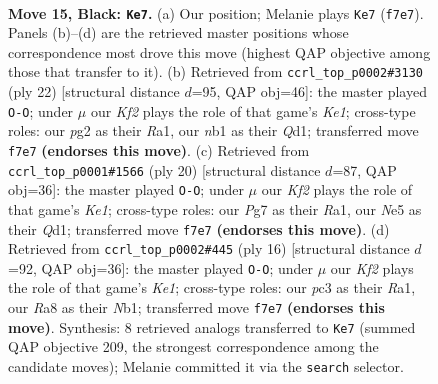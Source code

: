 \documentclass[11pt]{article}
\begin{document}
\clearpage

\begin{figure}[p]\centering
\begin{subfigure}{0.46\textwidth}\centering
\resizebox{\linewidth}{!}{%
\newchessgame
\chessboard[
  setfen={r2q4/1bp2kpp/1b1p1n2/pp2n3/4P3/2P5/PPQ2PPP/RNB1RK2 b - - 1 15},
  showmover=false,
  pgfstyle=straightmove, color=movearrow, markmove={f7-e7}
]}
\caption{}
\end{subfigure}\hfill
\begin{subfigure}{0.46\textwidth}\centering
\resizebox{\linewidth}{!}{%
\newchessgame
\chessboard[
  setfen={r1b1k2r/ppqn1pbp/6p1/4p3/2P5/5NP1/PB1P1PBP/R2QK2R w KQkq - 2 12},
  showmover=false,
  pgfstyle=straightmove, color=movearrow, markmove={e1-g1}
]}
\caption{}
\end{subfigure}
\\[4pt]
\begin{subfigure}{0.46\textwidth}\centering
\resizebox{\linewidth}{!}{%
\newchessgame
\chessboard[
  setfen={r1b2k1r/ppq2ppp/2n5/4p3/2B5/2P2N2/P2P1PPP/R2QK2R w KQ - 0 11},
  showmover=false,
  pgfstyle=straightmove, color=movearrow, markmove={e1-g1}
]}
\caption{}
\end{subfigure}\hfill
\begin{subfigure}{0.46\textwidth}\centering
\resizebox{\linewidth}{!}{%
\newchessgame
\chessboard[
  setfen={r1b1kb1r/p1q2ppp/2p2n2/3pp3/8/1P4P1/PBP1PPBP/RN1QK2R w KQkq - 0 9},
  showmover=false,
  pgfstyle=straightmove, color=movearrow, markmove={e1-g1}
]}
\caption{}
\end{subfigure}
\caption{\textbf{Move 15, Black: \texttt{Ke7}.} (a) Our position; Melanie plays \texttt{Ke7} (\texttt{f7e7}). Panels (b)--(d) are the retrieved master positions whose correspondence most drove this move (highest QAP objective among those that transfer to it). (b) Retrieved from \texttt{ccrl\_top\_p0002\#3130} (ply 22) [structural distance $d$=95, QAP obj=46]: the master played \texttt{O-O}; under $\mu$ our \emph{Kf2} plays the role of that game's \emph{Ke1}; cross-type roles: our \emph{p}g2 as their \emph{R}a1, our \emph{n}b1 as their \emph{Q}d1; transferred move \texttt{f7e7} \textbf{(endorses this move)}. (c) Retrieved from \texttt{ccrl\_top\_p0001\#1566} (ply 20) [structural distance $d$=87, QAP obj=36]: the master played \texttt{O-O}; under $\mu$ our \emph{Kf2} plays the role of that game's \emph{Ke1}; cross-type roles: our \emph{P}g7 as their \emph{R}a1, our \emph{N}e5 as their \emph{Q}d1; transferred move \texttt{f7e7} \textbf{(endorses this move)}. (d) Retrieved from \texttt{ccrl\_top\_p0002\#445} (ply 16) [structural distance $d$=92, QAP obj=36]: the master played \texttt{O-O}; under $\mu$ our \emph{Kf2} plays the role of that game's \emph{Ke1}; cross-type roles: our \emph{p}c3 as their \emph{R}a1, our \emph{R}a8 as their \emph{N}b1; transferred move \texttt{f7e7} \textbf{(endorses this move)}. Synthesis: 8 retrieved analogs transferred to \texttt{Ke7} (summed QAP objective 209, the strongest correspondence among the candidate moves); Melanie committed it via the \texttt{search} selector.}
\label{fig:thought-m29}
\end{figure}
\end{document}
